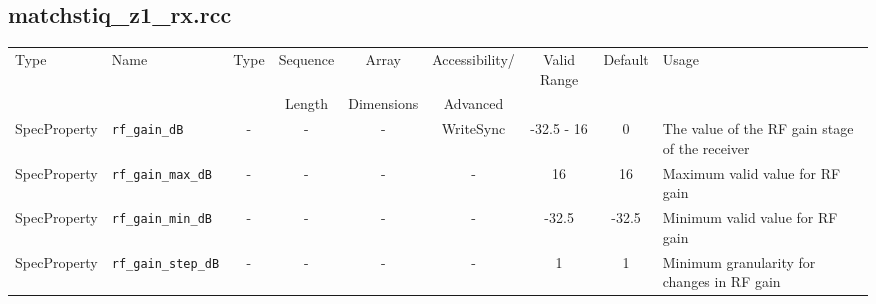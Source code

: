 \documentclass{article}
\def\comp{matchstiq\_z1\_rx}
\begin{document}
\begin{landscape}
	\subsection*{\comp.rcc}
	\begin{scriptsize}
		\begin{tabular}{|p{2cm}|p{4cm}|c|c|c|c|c|c|p{6.5cm}|}
			\hline
			\rowcolor{blue}
			Type         & Name                                & Type & Sequence & Array      & Accessibility/ & Valid Range  & Default & Usage                                                                                                                                                                                                                       \\
			\rowcolor{blue}
			             &                                     &      & Length   & Dimensions & Advanced       &              &         &                                                                                                                                                                                                                             \\
			\hline
			SpecProperty & \verb+rf_gain_dB+                   & -    & -        & -          & WriteSync      & -32.5 - 16   & 0       & The value of the RF gain stage of the receiver                                                                                                                                                                              \\
			\hline
			SpecProperty & \verb+rf_gain_max_dB+               & -    & -        & -          & -              & 16           & 16      & Maximum valid value for RF gain                                                                                                                                                                                             \\
			\hline
			SpecProperty & \verb+rf_gain_min_dB+               & -    & -        & -          & -              & -32.5        & -32.5   & Minimum valid value for RF gain                                                                                                                                                                                             \\
			\hline
			SpecProperty & \verb+rf_gain_step_dB+              & -    & -        & -          & -              & 1            & 1       & Minimum granularity for changes in RF gain                                                                                                                                                                                  \\

\end{tabular}
\end{scriptsize}
\end{landscape}
\end{document}
